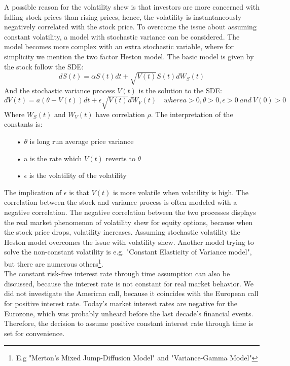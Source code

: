 A possible reason for the volatility shew is that investors are more concerned with falling stock prices than rising prices, hence, the volatility is instantaneously negatively correlated with the stock price. To overcome the issue about assuming constant volatility, a model with stochastic variance can be considered. The model becomes more complex with an extra stochastic variable, where for simplicity we mention the two factor Heston model. The basic model is given by the stock follow the SDE:
$$dS(t)=\alpha S(t) dt + \sqrt{V(t)} S(t) dW_S(t)$$
And the stochastic variance process $V(t)$ is the solution to the SDE:
$$dV(t)=a(\theta - V(t))dt + \epsilon \sqrt{V(t)} dW_V(t) \quad where a>0,\theta>0, \epsilon>0 \ and \ V(0)>0$$
Where $W_S(t)$ and $W_V(t)$ have correlation $\rho$. The interpretation of the constants is:
\begin{enumerate}
\item[•] $\theta$ is long run average price variance
\item[•] a is the rate which $V(t)$ reverts to $\theta$
\item[•] $\epsilon$ is the volatility of the volatility
\end{enumerate} 
The implication of $\epsilon$ is that $V(t)$ is more volatile when volatility is high. The correlation between the stock and variance process is often modeled with a negative correlation. The negative correlation between the two processes displays the real market phenomenon of volatility shew for equity options, because when the stock price drops, volatility increases. Assuming stochastic volatility the Heston model overcomes the issue with volatility shew. Another model trying to solve the non-constant volatility is e.g. "Constant Elasticity of Variance model", but there are numerous others\footnote{E.g "Merton's Mixed Jump-Diffusion Model" and "Variance-Gamma Model"}. \\

The constant risk-free interest rate through time assumption can also be discussed, because the interest rate is not constant for real market behavior. We did not investigate the American call, because it coincides with the European call for positive interest rate. Today's market interest rates are negative for the Eurozone, which was probably unheard before the last decade's financial events. Therefore, the decision to assume positive constant interest rate through time is set for convenience.\\

